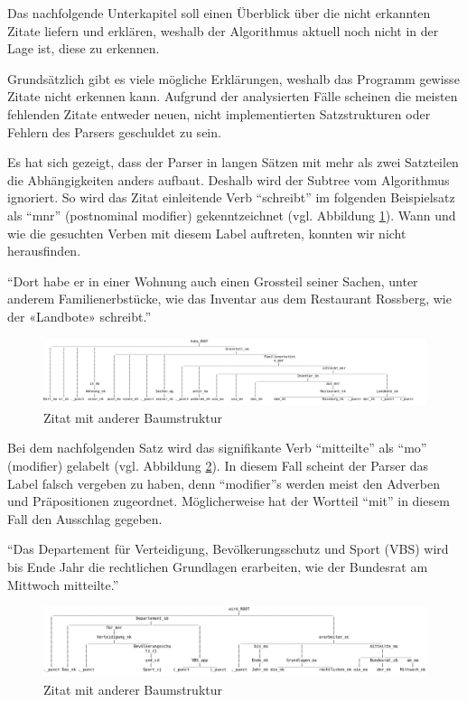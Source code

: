 Das nachfolgende Unterkapitel soll einen Überblick über die nicht erkannten Zitate liefern
und erklären, weshalb der Algorithmus aktuell noch nicht in der Lage ist, diese zu erkennen.

Grundsätzlich gibt es viele mögliche Erklärungen, weshalb das Programm gewisse Zitate nicht
erkennen kann. Aufgrund der analysierten Fälle scheinen die meisten fehlenden Zitate
entweder neuen, nicht implementierten Satzstrukturen oder Fehlern des Parsers geschuldet zu sein.

Es hat sich gezeigt, dass der Parser in langen Sätzen mit mehr als zwei Satzteilen
die Abhängigkeiten anders aufbaut. Deshalb wird der Subtree vom Algorithmus ignoriert.
So wird das Zitat einleitende Verb \enquote{schreibt} im folgenden Beispielsatz
als \enquote{mnr} (postnominal modifier) gekenntzeichnet (vgl. Abbildung \ref{citation-with-different-tree-structure-1}).
Wann und wie die gesuchten Verben mit diesem Label auftreten, konnten wir
nicht herausfinden.

\enquote{Dort habe er in einer Wohnung auch einen Grossteil seiner Sachen, unter anderem Familienerbstücke, wie das Inventar aus dem Restaurant Rossberg, wie der «Landbote» schreibt.}

\begin{figure}[H]
	\begin{center}
        \centering
		\includegraphics[width=1.0\linewidth]{./images/parse-tree-landbote.png}
	\end{center}
	\caption{Zitat mit anderer Baumstruktur}
	\label{citation-with-different-tree-structure-1}
\end{figure}

Bei dem nachfolgenden Satz wird das signifikante Verb \enquote{mitteilte} als \enquote{mo}
(modifier) gelabelt (vgl. Abbildung \ref{citation-with-different-tree-structure-2}).
In diesem Fall scheint der Parser das Label falsch vergeben zu haben,
denn \enquote{modifier}s werden meist den Adverben und Präpositionen zugeordnet.
Möglicherweise hat der Wortteil \enquote{mit} in diesem Fall den Ausschlag gegeben.

\enquote{Das Departement für Verteidigung, Bevölkerungsschutz und Sport (VBS) wird bis Ende Jahr die rechtlichen Grundlagen erarbeiten, wie der Bundesrat am Mittwoch mitteilte.}

\begin{figure}[H]
	\begin{center}
        \centering
		\includegraphics[width=1.0\linewidth]{./images/parse-tree-watson.png}
	\end{center}
	\caption{Zitat mit anderer Baumstruktur}
	\label{citation-with-different-tree-structure-2}
\end{figure}